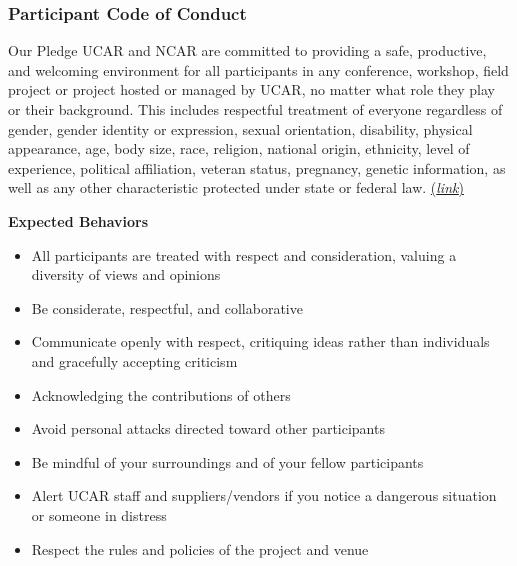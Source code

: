 \begin{frame}
  \frametitle{Participant Code of Conduct}
    \begin{block}{Our Pledge}
      UCAR and NCAR are committed to providing a safe, productive, and welcoming environment for all
      participants in any conference, workshop, field project or project hosted or managed by UCAR, no
      matter what role they play or their background. This includes respectful treatment of everyone
      regardless of gender, gender identity or expression, sexual orientation, disability, physical
      appearance, age, body size, race, religion, national origin, ethnicity, level of experience, political
      affiliation, veteran status, pregnancy, genetic information, as well as any other characteristic
      protected under state or federal law. \href{https://www.ucar.edu/who-we-are/ethics-integrity/codes-conduct/participants}{(\emph{\textcolor{DeepBlue}{link}})}
    \end{block}

    \vspace{2em}
    \textbf{Expected Behaviors}
    \begin{itemize}
    \item All participants are treated with respect and consideration, valuing a diversity of views and opinions
    \item Be considerate, respectful, and collaborative
    \item Communicate openly with respect, critiquing ideas rather than individuals and gracefully accepting criticism
    \item Acknowledging the contributions of others
    \item Avoid personal attacks directed toward other participants
    \item Be mindful of your surroundings and of your fellow participants
    \item Alert UCAR staff and suppliers/vendors if you notice a dangerous situation or someone in distress
    \item Respect the rules and policies of the project and venue
    \end{itemize}

\end{frame}

